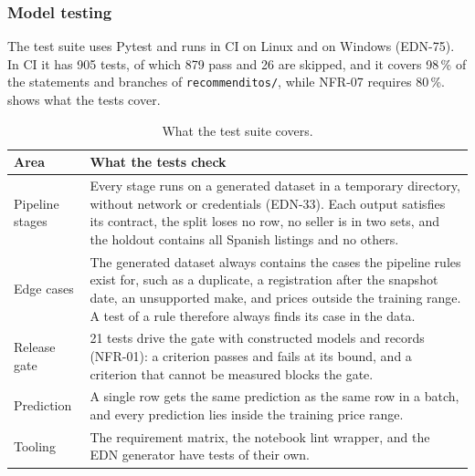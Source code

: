 \subsubsection{Model testing}
\label{sec:m3-model-testing}

The test suite uses Pytest and runs in CI on Linux and on Windows (EDN-75).
In CI it has 905 tests, of which 879 pass and 26 are skipped, and it covers 98\,\% of the statements and branches of \texttt{recommenditos/}, while NFR-07 requires 80\,\%.
 shows what the tests cover.

\begin{table}[ht]
  \centering\small
  \begin{tabularx}{\textwidth}{@{}>{\raggedright\arraybackslash}p{}X@{}}
    \toprule
    Area & What the tests check \\
    \midrule
    Pipeline stages & Every stage runs on a generated dataset in a temporary directory, without network or credentials (EDN-33). Each output satisfies its contract, the split loses no row, no seller is in two sets, and the holdout contains all Spanish listings and no others. \\
    \addlinespace[2pt]
    Edge cases & The generated dataset always contains the cases the pipeline rules exist for, such as a duplicate, a registration after the snapshot date, an unsupported make, and prices outside the training range. A test of a rule therefore always finds its case in the data. \\
    \addlinespace[2pt]
    Release gate & 21 tests drive the gate with constructed models and records (NFR-01): a criterion passes and fails at its bound, and a criterion that cannot be measured blocks the gate. \\
    \addlinespace[2pt]
    Prediction & A single row gets the same prediction as the same row in a batch, and every prediction lies inside the training price range. \\
    \addlinespace[2pt]
    Tooling & The requirement matrix, the notebook lint wrapper, and the EDN generator have tests of their own. \\
    \bottomrule
  \end{tabularx}
  \caption{What the test suite covers.}
  \label{tab:tests}
\end{table}

